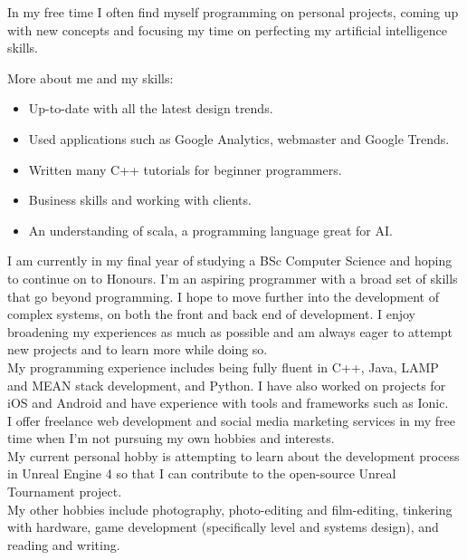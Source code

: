 	In my free time I often find myself programming on personal projects, coming up with new concepts and focusing my time on perfecting my artificial intelligence skills. 

	\noindent
	More about me and my skills:
    \begin{itemize}
        \item Up-to-date with all the latest design trends.
        \item Used applications such as Google Analytics, webmaster and Google Trends. 
        \item Written many C++ tutorials for beginner programmers.
        \item Business skills and working with clients. 
        \item An understanding of scala, a programming language great for AI. 
    \end{itemize}
    
%
%
\newpage
{}
I am currently in my final year of studying a BSc Computer Science and hoping to continue on to Honours. I'm an aspiring programmer with a broad set of skills that go beyond programming. I hope to move further into the development of complex systems, on both the front and back end of development. I enjoy broadening my experiences as much as possible and am always eager to attempt new projects and to learn more while doing so.\\

My programming experience includes being fully fluent in C++, Java, LAMP and MEAN stack development, and Python. I have also worked on projects for iOS and Android and have experience with tools and frameworks such as Ionic.\\

I offer freelance web development and social media marketing services in my free time when I'm not pursuing my own hobbies and interests.\\

My current personal hobby is attempting to learn about the development process in Unreal Engine 4 so that I can contribute to the open-source Unreal Tournament project.\\

My other hobbies include photography, photo-editing and film-editing, tinkering with hardware, game development (specifically level and systems design), and reading and writing.\\

